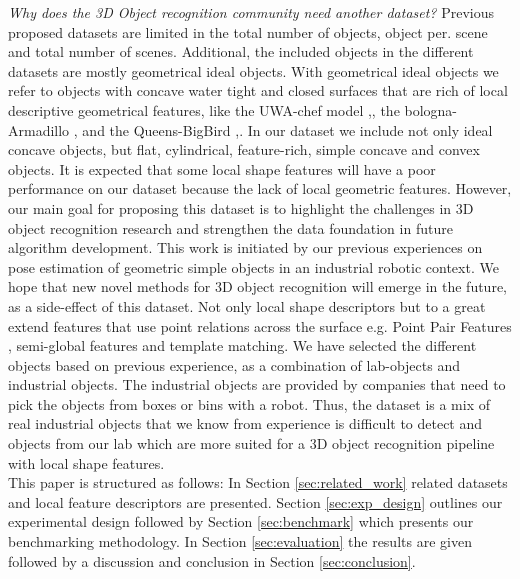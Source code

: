 \documentclass[10pt,twocolumn,letterpaper]{article}
\begin{document}
\indent \textit{Why does the 3D Object recognition community need another dataset?} Previous proposed datasets are limited in the total number of objects, object per. scene and total number of scenes. Additional, the included objects in the different datasets are mostly geometrical ideal objects. With geometrical ideal objects we refer to objects with concave water tight and closed surfaces that are rich of local descriptive geometrical features, like the UWA-chef model \cite{Mian2006},\cite{Mian2010}, the bologna-Armadillo \cite{Salti2014},\cite{Tombari2010} and the Queens-BigBird \cite{Taati2007},\cite{Taati2007}. In our dataset we include not only ideal concave objects, but flat, cylindrical, feature-rich, simple concave and convex objects. It is expected that some local shape features will have a poor performance on our dataset because the lack of local geometric features. However, our main goal for proposing this dataset is to highlight the challenges in 3D object recognition research and strengthen the data foundation in future algorithm development. This work is initiated by our previous experiences on pose estimation of geometric simple objects in an industrial robotic context. We hope that new novel methods for 3D object recognition will emerge in the future, as a side-effect of this dataset. Not only local shape descriptors but to a great extend features that use point relations across the surface e.g. Point Pair Features \cite{BirdalIlic2015}, semi-global features and template matching.    
We have selected the different objects based on previous experience, as a combination of lab-objects and industrial objects. The industrial objects are provided by companies that need to pick the objects from boxes or bins with a robot. Thus, the dataset is a mix of real industrial objects that we know from experience is difficult to detect and objects from our lab which are more suited for a 3D object recognition pipeline with local shape features.\\
\indent This paper is structured as follows: In Section \ref{sec:related_work} related datasets and local feature descriptors are presented. Section \ref{sec:exp_design} outlines our experimental design followed by Section \ref{sec:benchmark} which presents our benchmarking methodology. In Section \ref{sec:evaluation} the results are given followed by a discussion and conclusion in Section \ref{sec:conclusion}. 
\end{document}
